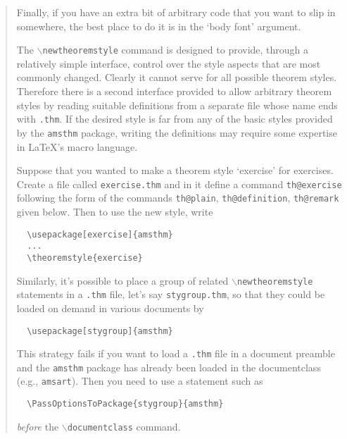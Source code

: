 \documentclass[a4paper]{article}
\newcommand\cn[1]{$\mathtt\backslash$\texttt{#1}}
\theoremstyle{definition}
\theoremstyle{remark}
\theoremstyle{remark}
\begin{document}
\begin{quotation}
Finally, if you have an extra bit of arbitrary code that you want
     to slip in somewhere, the best place to do it is in the `body font'
     argument.

The \cn{newtheoremstyle} command is designed to provide, through a
     relatively simple interface, control over the style aspects that
     are most commonly changed. Clearly it cannot serve for all possible
     theorem styles. Therefore there is a second interface provided to
     allow arbitrary theorem styles by reading suitable definitions from
     a separate file whose name ends with \texttt{.thm}. If the desired
     style is far from any of the basic styles provided by the
     \texttt{amsthm} package, writing the definitions may require some
     expertise in \LaTeX's macro language.

Suppose that you wanted to make a theorem style `exercise' for
     exercises. Create a file called \texttt{exercise.thm} and in it define
     a command \texttt{th@exercise} following the form of the commands
     \texttt{th@plain}, \texttt{th@definition}, \texttt{th@remark} given below. Then
     to use the new style, write
\begin{verbatim}
  \usepackage[exercise]{amsthm}
  ...
  \theoremstyle{exercise}
\end{verbatim}
     Similarly, it's possible to place a group of related
     \cn{newtheoremstyle} statements in a \texttt{.thm} file, let's say
     \texttt{stygroup.thm}, so that they could be loaded on demand in
     various documents by
\begin{verbatim}
  \usepackage[stygroup]{amsthm}
\end{verbatim}

This strategy fails if you want to load a \texttt{.thm} file in a
     document preamble and the \texttt{amsthm} package has already been
     loaded in the documentclass (e.g., \texttt{amsart}). Then you need to
     use a statement such as
\begin{verbatim}
  \PassOptionsToPackage{stygroup}{amsthm}
\end{verbatim}
     \emph{before} the \cn{documentclass} command.
\end{quotation}
\end{document}
